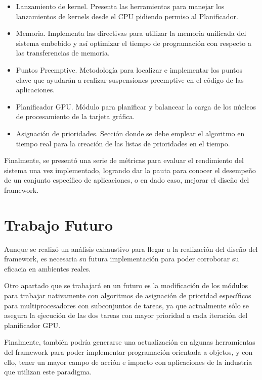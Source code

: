 \begin{itemize}
\item Lanzamiento de kernel. Presenta las herramientas para manejar los lanzamientos de kernels desde el CPU pidiendo permiso al Planificador.
\item Memoria. Implementa las directivas para utilizar la memoria unificada del sistema embebido y así optimizar el tiempo de programación con respecto a las transferencias de memoria.
\item Puntos Preemptive. Metodología para localizar e implementar los puntos clave que ayudarán a realizar suspensiones preemptive en el código de las aplicaciones.
\item Planificador GPU. Módulo para planificar y balancear la carga de los núcleos de procesamiento de la tarjeta gráfica. 
\item Asignación de prioridades. Sección donde se debe emplear el algoritmo en tiempo real para la creación de las listas de prioridades en el tiempo.
\end{itemize}

Finalmente, se presentó una serie de métricas para evaluar el rendimiento del sistema una vez implementado, logrando dar la pauta para conocer el desempeño de un conjunto específico de aplicaciones, o en dado caso, mejorar el diseño del framework.

\section{Trabajo Futuro}
Aunque se realizó un análisis exhaustivo para llegar a la  realización del diseño del framework, es necesaria su futura implementación para poder corroborar su eficacia en ambientes reales.

Otro apartado que se trabajará en un futuro es la modificación de los módulos para trabajar nativamente con algoritmos de asignación de prioridad específicos para multiprocesadores con subconjuntos de tareas, ya que actualmente sólo se asegura la ejecución de las dos tareas con mayor prioridad a cada iteración del planificador GPU.  

Finalmente, también podría generarse una actualización en algunas herramientas del framework para poder implementar programación orientada a objetos, y con ello, tener un mayor campo de acción e impacto con aplicaciones de la industria que utilizan este paradigma. 